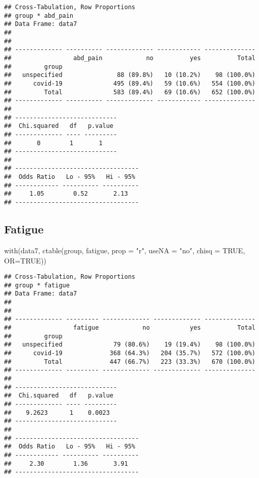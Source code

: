 \documentclass[
]{article}
\newenvironment{Shaded}{\begin{snugshade}}{\end{snugshade}}
\newcommand{\AttributeTok}[1]{\textcolor[rgb]{0.77,0.63,0.00}{#1}}
\newcommand{\ConstantTok}[1]{\textcolor[rgb]{0.00,0.00,0.00}{#1}}
\newcommand{\FunctionTok}[1]{\textcolor[rgb]{0.00,0.00,0.00}{#1}}
\newcommand{\NormalTok}[1]{#1}
\newcommand{\StringTok}[1]{\textcolor[rgb]{0.31,0.60,0.02}{#1}}
\begin{document}
\begin{verbatim}
## Cross-Tabulation, Row Proportions  
## group * abd_pain  
## Data Frame: data7  
## 
## 
## ------------- ---------- ------------- ------------ --------------
##                 abd_pain            no          yes          Total
##         group                                                     
##   unspecified               88 (89.8%)   10 (10.2%)    98 (100.0%)
##      covid-19              495 (89.4%)   59 (10.6%)   554 (100.0%)
##         Total              583 (89.4%)   69 (10.6%)   652 (100.0%)
## ------------- ---------- ------------- ------------ --------------
## 
## ----------------------------
##  Chi.squared   df   p.value 
## ------------- ---- ---------
##       0        1       1    
## ----------------------------
## 
## ----------------------------------
##  Odds Ratio   Lo - 95%   Hi - 95% 
## ------------ ---------- ----------
##     1.05        0.52       2.13   
## ----------------------------------
\end{verbatim}

\hypertarget{fatigue}{%
\subsection{Fatigue}\label{fatigue}}

\begin{Shaded}
\begin{Highlighting}[]
\FunctionTok{with}\NormalTok{(data7, }\FunctionTok{ctable}\NormalTok{(group, fatigue, }\AttributeTok{prop =} \StringTok{"r"}\NormalTok{, }\AttributeTok{useNA =} \StringTok{"no"}\NormalTok{, }\AttributeTok{chisq =} \ConstantTok{TRUE}\NormalTok{, }\AttributeTok{OR=}\ConstantTok{TRUE}\NormalTok{))}
\end{Highlighting}
\end{Shaded}

\begin{verbatim}
## Cross-Tabulation, Row Proportions  
## group * fatigue  
## Data Frame: data7  
## 
## 
## ------------- --------- ------------- ------------- --------------
##                 fatigue            no           yes          Total
##         group                                                     
##   unspecified              79 (80.6%)    19 (19.4%)    98 (100.0%)
##      covid-19             368 (64.3%)   204 (35.7%)   572 (100.0%)
##         Total             447 (66.7%)   223 (33.3%)   670 (100.0%)
## ------------- --------- ------------- ------------- --------------
## 
## ----------------------------
##  Chi.squared   df   p.value 
## ------------- ---- ---------
##    9.2623      1    0.0023  
## ----------------------------
## 
## ----------------------------------
##  Odds Ratio   Lo - 95%   Hi - 95% 
## ------------ ---------- ----------
##     2.30        1.36       3.91   
## ----------------------------------
\end{verbatim}
\end{document}
